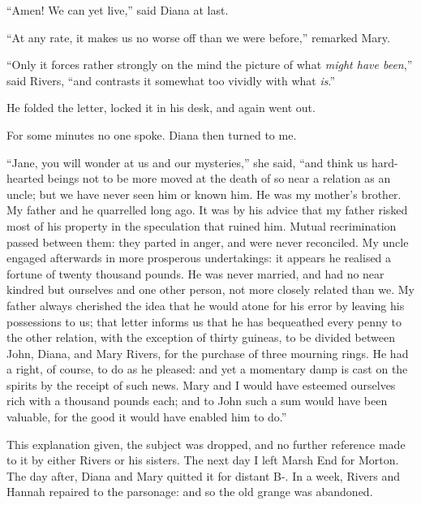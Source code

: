 \enquote{Amen! We can yet live,} said Diana at last.

\enquote{At any rate, it makes us no worse off than we were before,}
remarked Mary.

\enquote{Only it forces rather strongly on the mind the picture of what
\emph{might have been},} said \Mr{} Rivers, \enquote{and contrasts it somewhat
too vividly with what \emph{is}.}

He folded the letter, locked it in his desk, and again went out.

For some minutes no one spoke. Diana then turned to me.

\enquote{Jane, you will wonder at us and our mysteries,} she said,
\enquote{and think us hard-hearted beings not to be more moved at the
death of so near a relation as an uncle; but we have never seen him or
known him. He was my mother's brother. My father and he quarrelled
long ago. It was by his advice that my father risked most of his
property in the speculation that ruined him. Mutual recrimination
passed between them: they parted in anger, and were never reconciled. 
My uncle engaged afterwards in more prosperous undertakings: it appears
he realised a fortune of twenty thousand pounds. He was never married,
and had no near kindred but ourselves and one other person, not more
closely related than we. My father always cherished the idea that he
would atone for his error by leaving his possessions to us; that letter
informs us that he has bequeathed every penny to the other relation,
with the exception of thirty guineas, to be divided between \St{} John,
Diana, and Mary Rivers, for the purchase of three mourning rings. He
had a right, of course, to do as he pleased: and yet a momentary damp is
cast on the spirits by the receipt of such news. Mary and I would have
esteemed ourselves rich with a thousand pounds each; and to \St{} John
such a sum would have been valuable, for the good it would have enabled
him to do.}

This explanation given, the subject was dropped, and no further
reference made to it by either \Mr{} Rivers or his sisters. The next day
I left Marsh End for Morton. The day after, Diana and Mary quitted it
for distant B-. In a week, \Mr{} Rivers and Hannah repaired to the
parsonage: and so the old grange was abandoned.
